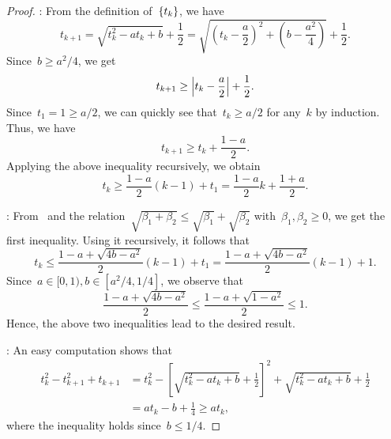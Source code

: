 \documentclass[../main]{subfiles}
\begin{document}
\begin{proof}
    :
    From the definition of~$\set{t_k}$, we have
    \begin{equation} \label{eq:t cs}
        t_{k + 1} = \sqrt{t_k^2 - a t_k + b} + \frac{1}{2}
        = \sqrt{\left( t_k - \frac{a}{2} \right)^2 + \left( b - \frac{a^2}{4} \right)} + \frac{1}{2}
        .\end{equation}
    Since~$b \ge a^2 / 4$, we get
    \begin{equation}
        t_{k + 1} \ge \abs*{t_k - \frac{a}{2}} + \frac{1}{2}
        .\end{equation}
    Since~$t_1 = 1 \ge a / 2$, we can quickly see that~$t_k \ge a / 2$ for any~$k$ by induction.
    Thus, we have
    \begin{equation}
        t_{k + 1} \ge t_k + \frac{1 - a}{2}
        .\end{equation}
    Applying the above inequality recursively, we obtain
    \begin{equation}
        t_k \ge \frac{1 - a}{2} (k - 1) + t_1 = \frac{1 - a}{2} k + \frac{1 + a}{2}
        .\end{equation}

    :
    From~ and the relation~$\sqrt{\beta_1 + \beta_2} \le \sqrt{\beta_1} + \sqrt{\beta_2}$ with~$\beta_1, \beta_2 \ge 0$, we get the first inequality.
    Using it recursively, it follows that
    \begin{equation}
        t_k \le \frac{1 - a + \sqrt{4 b - a^2}}{2} (k - 1) + t_1 = \frac{1 - a + \sqrt{4 b - a^2}}{2} (k - 1) + 1
        .\end{equation}
    Since~$a \in [0, 1), b \in [a^2 / 4, 1 / 4]$, we observe that
    \begin{equation}
        \frac{1 - a + \sqrt{4 b - a^2}}{2} \le \frac{1 - a + \sqrt{1 - a^2}}{2} \le 1
        .\end{equation}
    Hence, the above two inequalities lead to the desired result.

    :
    An easy computation shows that
    \begin{equation}
        \begin{split}
            t_k^2 - t_{k + 1}^2 + t_{k + 1} &= t_k^2 - \left[ \sqrt{t_k^2 - a t_k + b} + \frac{1}{2} \right]^2 + \sqrt{t_k^2 - a t_k + b} + \frac{1}{2} \\
            &= a t_k - b + \frac{1}{4} \ge a t_k
            ,\end{split}
    \end{equation}
    where the inequality holds since~$b \le 1 / 4$.


\end{proof}
\end{document}
